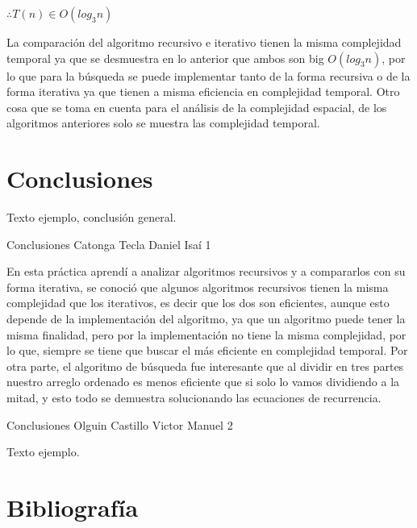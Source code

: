 \documentclass[12pt,twoside]{article}
\begin{document}
\begin{center}
  $\therefore T(n)\in O(log_3n)$
\end{center}

La comparación del algoritmo recursivo e iterativo tienen la misma complejidad temporal ya que se desmuestra en lo anterior que ambos son
big $O(log_3n)$, por lo que para la búsqueda se puede implementar tanto de la forma recursiva o de la forma iterativa ya que tienen a misma eficiencia
en complejidad temporal. Otro cosa que se toma en cuenta para el análisis de la complejidad espacial, de los algoritmos anteriores solo se muestra
las complejidad temporal.

\newpage
\section{Conclusiones}
Texto ejemplo, conclusión general.
\medskip

Conclusiones Catonga Tecla Daniel Isaí 1
\par
En esta práctica aprendí a analizar algoritmos recursivos y a compararlos con su forma iterativa, se conoció que algunos algoritmos recursivos tienen la misma complejidad que los iterativos, es decir que los dos son eficientes, aunque esto depende de la implementación del algoritmo, ya que un algoritmo puede tener la misma finalidad, pero por la implementación no tiene la misma complejidad, por lo que, siempre se tiene que buscar el más eficiente en complejidad temporal. Por otra parte, el algoritmo de búsqueda fue interesante que al dividir en tres partes nuestro arreglo ordenado es menos eficiente que si solo lo vamos dividiendo a la mitad, y esto todo se demuestra solucionando las ecuaciones de recurrencia.

\medskip

Conclusiones Olguin Castillo Victor Manuel 2
\par
Texto ejemplo.

\newpage
\section{Bibliograf\'ia}

\printbibliography[title={ }]
\end{document}
